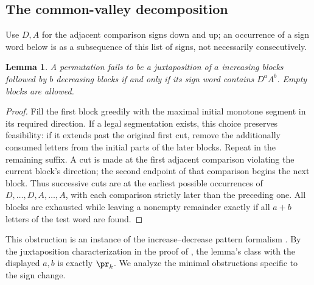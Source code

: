 \documentclass[11pt,a4paper]{article}
\numberwithin{equation}{section}
\newtheorem{lemma}[theorem]{Lemma}
\theoremstyle{definition}
\theoremstyle{remark}
\begin{document}
\subsection{The common-valley decomposition}
Use $D,A$ for the adjacent comparison signs down and up; an occurrence of a sign word below is as a subsequence of this list of signs, not necessarily consecutively.

\begin{lemma}\label{r33reiwa:L}
A permutation fails to be a juxtaposition of $a$ increasing blocks followed by $b$ decreasing blocks if and only if its sign word contains $D^a A^b$. Empty blocks are allowed.
\end{lemma}
\begin{proof}
Fill the first block greedily with the maximal initial monotone segment in its required direction. If a legal segmentation exists, this choice preserves feasibility: if it extends past the original first cut, remove the additionally consumed letters from the initial parts of the later blocks. Repeat in the remaining suffix. A cut is made at the first adjacent comparison violating the current block's direction; the second endpoint of that comparison begins the next block. Thus successive cuts are at the earliest possible occurrences of $D,\ldots,D,A,\ldots,A$, with each comparison strictly later than the preceding one. All blocks are exhausted while leaving a nonempty remainder exactly if all $a+b$ letters of the test word are found.
\end{proof}
This obstruction is an instance of the increase--decrease pattern formalism \cite{r33reiwa:HR}. By the juxtaposition characterization in the proof of \cite[Thm.~4.5]{r33reiwa:PS}, the lemma's class with the displayed $a,b$ is exactly $\pr_k$. We analyze the minimal obstructions specific to the sign change.
\end{document}
